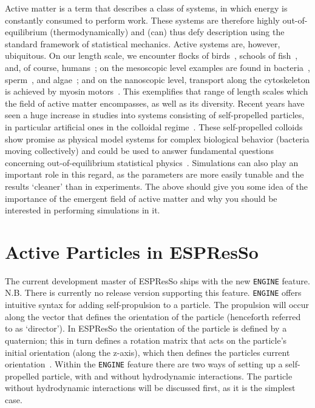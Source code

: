 \documentclass[aip,jcp,reprint,a4paper,onecolumn,amsmath]{revtex4-1}
\newcommand\code{\lstinline}
\newcommand{\es}{\mbox{\textsf{ESPResSo}}\xspace}
\begin{document}
Active matter is a term that describes a class of systems, in which energy is constantly consumed to perform work. These systems are therefore highly out-of-equilibrium (thermodynamically) and (can) thus defy description using the standard framework of statistical mechanics. Active systems are, however, ubiquitous. On our length scale, we encounter flocks of birds~\cite{Ballerini_08}, schools of fish~\cite{Katz_11}, and, of course, humans~\cite{Helbing_00,Zhang_13,Sliverberg_13}; on the mesoscopic level examples are found in bacteria~\cite{Sokolov_07,Schwarz-Linek_12,Reufer_14}, sperm~\cite{Woolley_03,Riedel_05,Ma_14}, and algae~\cite{Polin_09,Geyer_13}; and on the nanoscopic level, transport along the cytoskeleton is achieved by myosin motors~\cite{Mizuno07}. This exemplifies that range of length scales which the field of active matter encompasses, as well as its diversity. Recent years have seen a huge increase in studies into systems consisting of self-propelled particles, in particular artificial ones in the colloidal regime~\cite{ismagilov,Paxton_04,Wang_06,Brown,Ebbens,Ebbens_12,Howse_07,Valadares_10,simmchen,Yoshinaga,Baraban_13a,Buttinoni_12,Solovev_09,Mei_11}. These self-propelled colloids show promise as physical model systems for complex biological behavior (bacteria moving collectively) and could be used to answer fundamental questions concerning out-of-equilibrium statistical physics~\cite{Cates_12,Cates_14}. Simulations can also play an important role in this regard, as the parameters are more easily tunable and the results `cleaner' than in experiments. The above should give you some idea of the importance of the emergent field of active matter and why you should be interested in performing simulations in it.

\section{\label{sec:swimming}Active Particles in ESPResSo}

The current development master of \es{} ships with the new \code{ENGINE} feature. N.B. There is currently no release version supporting this feature. \code{ENGINE} offers intuitive syntax for adding self-propulsion to a particle. The propulsion will occur along the vector that defines the orientation of the particle (henceforth referred to as `director'). In \es{} the orientation of the particle is defined by a quaternion; this in turn defines a rotation matrix that acts on the particle's initial orientation (along the z-axis), which then defines the particles current orientation~\cite{UG,Limbach_06,Arnold_13}. Within the \code{ENGINE} feature there are two ways of setting up a self-propelled particle, with and without hydrodynamic interactions. The particle without hydrodynamic interactions will be discussed first, as it is the simplest case.
\end{document}
